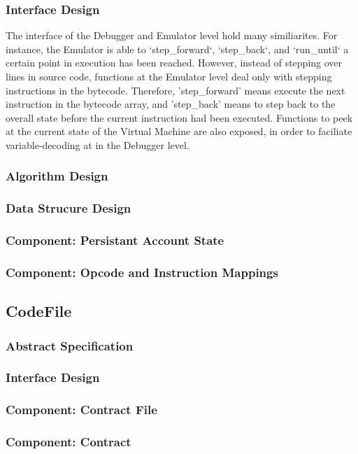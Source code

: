 \documentclass{report}
\begin{document}
    \subsubsection{Interface Design}
        The interface of the Debugger and Emulator level hold many similiarites. For instance, the Emulator is able to `step\_forward`, `step\_back`, and `run\_until` a certain point in execution has been reached. However, instead of stepping over lines in source code, functions at the Emulator level deal only with stepping instructions in the bytecode. Therefore, 'step\_forward' means execute the next instruction in the bytecode array, and 'step\_back' means to step back to the overall state before the current instruction had been executed. Functions to peek at the current state of the Virtual Machine are also exposed, in order to faciliate variable-decoding at in the Debugger level.

    \subsubsection{Algorithm Design}
    \subsubsection{Data Strucure Design}
    \subsubsection{Component: Persistant Account State}
    \subsubsection{Component: Opcode and Instruction Mappings}

\subsection{CodeFile}
    \subsubsection{Abstract Specification}
    \subsubsection{Interface Design}
    \subsubsection{Component: Contract File}
    \subsubsection{Component: Contract}
\end{document}
